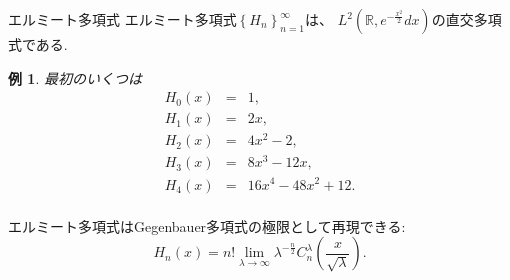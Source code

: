 \documentclass[pdf,notes]{beamer}
\newtheorem*{example*}{例}
\begin{document}
\begin{frame}{エルミート多項式}
エルミート多項式$\left\{ H_n \right\}_{n=1}^\infty$は、
	$L^2\left( \mathbb{R},e^{-\frac{x^2}{2}}dx \right)$の直交多項式である.
	\begin{example*}
		最初のいくつは
	\vspace{-0.3cm}
		\begin{eqnarray*}
		H_0(x)&=& 1,\\
		H_1(x)&=& 2x,\\
		H_2(x)&=& 
		4x^2-2,\\
		H_3(x)&=& 8x^3-12x,\\
		H_4(x)&=& 16x^4-48x^2+12.\\
		\end{eqnarray*}
	\end{example*}
	エルミート多項式はGegenbauer多項式の極限として再現できる:
	\begin{equation*}
			H_n (x) = n! \lim_{\lambda \rightarrow \infty} \lambda^{- \frac{n}{2}}
			C_n^{\lambda} \left( \frac{x}{\sqrt{\lambda}} \right).
	\end{equation*}
\end{frame}
\end{document}
